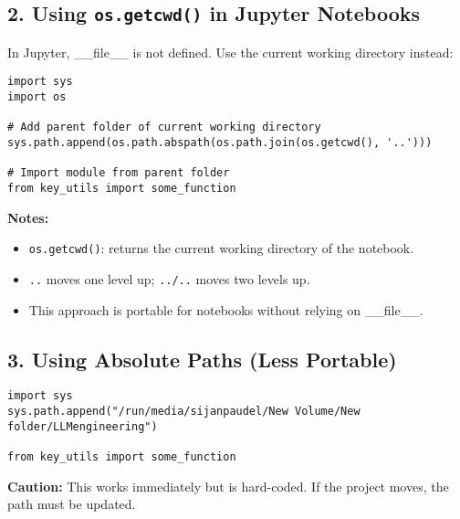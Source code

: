 \documentclass[a4paper, 12pt]{article}
\begin{document}
\subsection*{2. Using \texttt{os.getcwd()} in Jupyter Notebooks}

In Jupyter, \_\_file\_\_ is not defined. Use the current working directory instead:

\begin{tcolorbox}[colback=gray!5, colframe=gray!80!black, title=Jupyter Notebook: Using os.getcwd()]
\begin{verbatim}
import sys
import os

# Add parent folder of current working directory
sys.path.append(os.path.abspath(os.path.join(os.getcwd(), '..')))

# Import module from parent folder
from key_utils import some_function
\end{verbatim}
\end{tcolorbox}

\textbf{Notes:}
\begin{itemize}
    \item \texttt{os.getcwd()}: returns the current working directory of the notebook.
    \item \texttt{..} moves one level up; \texttt{../..} moves two levels up.
    \item This approach is portable for notebooks without relying on \_\_file\_\_.
\end{itemize}

\subsection*{3. Using Absolute Paths (Less Portable)}

\begin{tcolorbox}[colback=gray!5, colframe=gray!80!black, title=Absolute Path Approach]
\begin{verbatim}
import sys
sys.path.append("/run/media/sijanpaudel/New Volume/New folder/LLMengineering")

from key_utils import some_function
\end{verbatim}
\end{tcolorbox}


\textbf{Caution:} This works immediately but is hard-coded. If the project moves, the path must be updated.
\end{document}
